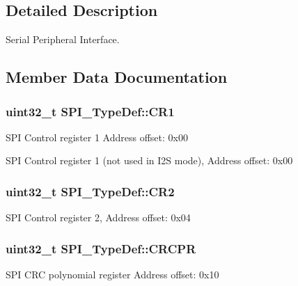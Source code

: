 \subsection{Detailed Description}
Serial Peripheral Interface. 

\subsection{Member Data Documentation}
\hypertarget{struct_s_p_i___type_def_a6ecd5cb63b85c381bd67dc90dd4f573a}{
\subsubsection[{C\-R1}]{ uint32\-\_\-t S\-P\-I\-\_\-\-Type\-Def\-::\-C\-R1}}\label{struct_s_p_i___type_def_a6ecd5cb63b85c381bd67dc90dd4f573a}
S\-P\-I Control register 1 Address offset\-: 0x00

S\-P\-I Control register 1 (not used in I2\-S mode), Address offset\-: 0x00 \hypertarget{struct_s_p_i___type_def_a38cb89a872e456e6ecd29b6c71d85600}{
\subsubsection[{C\-R2}]{ uint32\-\_\-t S\-P\-I\-\_\-\-Type\-Def\-::\-C\-R2}}\label{struct_s_p_i___type_def_a38cb89a872e456e6ecd29b6c71d85600}
S\-P\-I Control register 2, Address offset\-: 0x04 \hypertarget{struct_s_p_i___type_def_a609d2a279b1927846a991deb9d0dc0b0}{
\subsubsection[{C\-R\-C\-P\-R}]{ uint32\-\_\-t S\-P\-I\-\_\-\-Type\-Def\-::\-C\-R\-C\-P\-R}}\label{struct_s_p_i___type_def_a609d2a279b1927846a991deb9d0dc0b0}
S\-P\-I C\-R\-C polynomial register Address offset\-: 0x10

